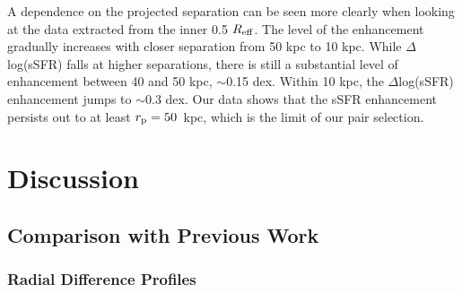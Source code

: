 \documentclass[iop,revtex4,twocolumn,apj,numberedappendix,appendixfloats]{emulateapj}
\newcommand{\reff}{$R_{\rm eff}$}
\begin{document}
A dependence on the projected separation can be seen more clearly when looking at the data extracted from the inner 0.5 \reff. The level of the enhancement gradually increases with closer separation from 50 kpc to 10 kpc. While $\Delta$log(sSFR) falls at higher separations, there is still a substantial level of enhancement between 40 and 50 kpc, $\sim$0.15 dex. Within 10 kpc, the $\Delta$log(sSFR) enhancement jumps to $\sim$0.3 dex. Our data shows that the sSFR enhancement persists out to at least $r_{\rm p} = 50$~kpc, which is the limit of our pair selection. 



\section{Discussion}\label{sec:disc}

\subsection{Comparison with Previous Work}

\subsubsection{Radial Difference Profiles}
\end{document}
